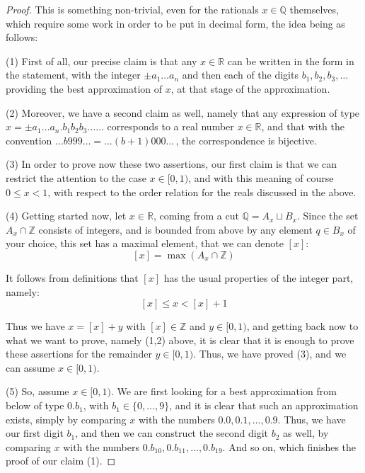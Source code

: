 \documentclass[12pt]{amsbook}
\begin{document}
\begin{proof}
This is something non-trivial, even for the rationals $x\in\mathbb Q$ themselves, which require some work in order to be put in decimal form, the idea being as follows:

\medskip

(1) First of all, our precise claim is that any $x\in\mathbb R$ can be written in the form in the statement, with the integer $\pm a_1\ldots a_n$ and then each of the digits $b_1,b_2,b_3,\ldots$ providing the best approximation of $x$, at that stage of the approximation. 

\medskip

(2) Moreover, we have a second claim as well, namely that any expression of type $x=\pm a_1\ldots a_n.b_1b_2b_3\ldots\ldots$ corresponds to a real number $x\in\mathbb R$, and that with the convention $\ldots b999\ldots=\ldots(b+1)000\ldots\,$, the correspondence is bijective.

\medskip

(3) In order to prove now these two assertions, our first claim is that we can restrict the attention to the case $x\in[0,1)$, and with this meaning of course $0\leq x<1$, with respect to the order relation for the reals discussed in the above.

\medskip

(4) Getting started now, let $x\in\mathbb R$, coming from a cut $\mathbb Q=A_x\sqcup B_x$. Since the set $A_x\cap\mathbb Z$ consists of integers, and is bounded from above by any element $q\in B_x$ of your choice, this set has a maximal element, that we can denote $[x]$:
$$[x]=\max\left(A_x\cap\mathbb Z\right)$$

It follows from definitions that $[x]$ has the usual properties of the integer part, namely:
$$[x]\leq x<[x]+1$$

Thus we have $x=[x]+y$ with $[x]\in\mathbb Z$ and $y\in[0,1)$, and getting back now to what we want to prove, namely (1,2) above, it is clear that it is enough to prove these assertions for the remainder $y\in[0,1)$. Thus, we have proved (3), and we can assume $x\in[0,1)$.

\medskip

(5) So, assume $x\in[0,1)$. We are first looking for a best approximation from below of type $0.b_1$, with $b_1\in\{0,\ldots,9\}$, and it is clear that such an approximation exists, simply by comparing $x$ with the numbers $0.0,0.1,\ldots,0.9$. Thus, we have our first digit $b_1$, and then we can construct the second digit $b_2$ as well, by comparing $x$ with the numbers $0.b_10,0.b_11,\ldots,0.b_19$. And so on, which finishes the proof of our claim (1).


\end{proof}
\end{document}
